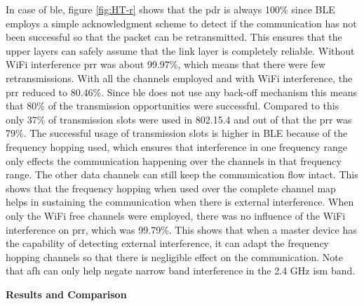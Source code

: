 In case of \gls{ble}, figure \ref{fig:HT-r} shows that the \gls{pdr} is always 100\% since BLE employs a simple acknowledgment scheme to detect if the communication has not been successful so that the packet can be retransmitted. This ensures that the upper layers can safely assume that the link layer is completely reliable. Without WiFi interference \gls{prr} was about 99.97\%, which means that there were few retransmissions. With all the channels employed and with WiFi interference, the \gls{prr} reduced to 80.46\%. Since \gls{ble} does not use any back-off mechanism this means that 80\% of the transmission opportunities were successful. Compared to this only 37\% of transmission slots were used in 802.15.4 and out of that the \gls{prr} was 79\%.  The successful usage of transmission slots is higher in BLE because of the frequency hopping used, which ensures that interference in one frequency range only effects the communication happening over the channels in that frequency range. The other data channels can still keep the communication flow intact. This shows that the frequency hopping when used over the complete channel map helps in sustaining the communication when there is external interference. When only the WiFi free channels were employed, there was no influence of the WiFi interference on \gls{prr}, which was 99.79\%. This shows that when a master device has the capability of detecting external interference, it can adapt the frequency hopping channels so that there is negligible effect on the communication. Note that \gls{afh} can only help negate narrow band interference in the 2.4 GHz \gls{ism} band.

\vspace{7pt}
\noindent\textbf{Results and Comparison}

